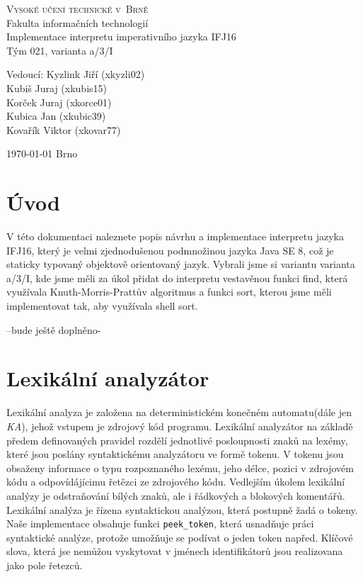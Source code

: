 \documentclass[a4paper,11pt]{article}
\begin{document}
\begin{center}
\Huge
\textsc{Vysoké učení technické v~Brně\\
}Fakulta informačních technologií\\
\LARGE Implementace interpretu imperativního jazyka IFJ16 \\
\Huge Tým 021, varianta a/3/I\\

\Large Vedoucí:	Kyzlink Jiří 	(xkyzli02)\\
				Kubiš Juraj		(xkubis15)\\
				Korček Juraj	(xkorce01)\\
				Kubica Jan		(xkubic39)\\
				Kovařík Viktor	(xkovar77)\\


\end{center}
{\Large \today \hfill
Brno}
\thispagestyle{empty}

\newpage

\tableofcontents

\newpage
\section{Úvod}
V této dokumentaci naleznete popis návrhu a implementace interpretu jazyka IFJ16, který je velmi zjednodušenou podmnožinou jazyka Java SE 8, což je staticky typovaný objektově orientovaný jazyk. Vybrali jsme si variantu varianta a/3/I, kde jsme měli za úkol přidat do interpretu vestavěnou funkci find, která využívala Knuth-Morris-Prattův algoritmus a funkci sort, kterou jsme měli implementovat tak, aby využívala shell sort.

--bude ještě doplněno-

\section{Lexikální analyzátor}
Lexikální analyza je založena na deterministickém konečném automatu(dále jen \textit{KA}), jehož vstupem je zdrojový kód programu. Lexikální analyzátor na základě předem definovaných pravidel rozdělí jednotlivé posloupnosti znaků na lexémy, které jsou poslány syntaktickému analyzátoru ve formě tokenu. V tokenu jsou obsaženy informace o typu rozpoznaného lexému, jeho délce, pozici v zdrojovém kódu a odpovídájícimu řetězci ze zdrojového kódu. Vedlejším úkolem lexikální analýzy je odstraňování bílých znaků, ale i řádkových a blokových komentářů. Lexikální analýza je řízena syntaktickou analýzou, která postupně žadá o tokeny. Naše implementace obsahuje funkci \texttt{peek\_token}, která usnadňuje práci syntaktické analýze, protože umožňuje se podívat o jeden token napřed. Klíčové slova, která jse nemůžou vyskytovat v jménech identifikátorů jsou realizovana jako pole řetezců.
\end{document}
